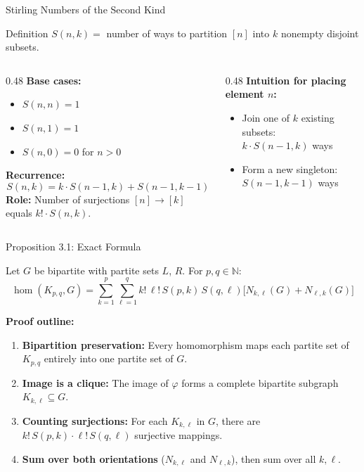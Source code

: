 \documentclass[aspectratio=169]{beamer}
\begin{document}
\begin{frame}{Stirling Numbers of the Second Kind}
  \begin{block}{Definition}
    $S(n,k) = $ number of ways to partition $[n]$ into $k$ nonempty disjoint subsets.
  \end{block}

  \begin{columns}
    \begin{column}{0.48\textwidth}
      \textbf{Base cases:}
      \begin{itemize}
        \item $S(n,n) = 1$
        \item $S(n,1) = 1$
        \item $S(n,0) = 0$ for $n > 0$
      \end{itemize}
      \textbf{Recurrence:}
      \[
        S(n,k) = k \cdot S(n-1,k) + S(n-1,k-1)
      \]
      \textbf{Role:} Number of surjections $[n] \to [k]$ equals $k! \cdot S(n,k)$.
    \end{column}
    \begin{column}{0.48\textwidth}
      \textbf{Intuition for placing element $n$:}
      \begin{itemize}
        \item Join one of $k$ existing subsets:\\
          $k \cdot S(n-1,k)$ ways
        \item Form a new singleton:\\
          $S(n-1,k-1)$ ways
      \end{itemize}
    \end{column}
  \end{columns}
\end{frame}

\begin{frame}{Proposition 3.1: Exact Formula}
  \begin{theorem}[Proposition 3.1]
    Let $G$ be bipartite with partite sets $L$, $R$. For $p, q \in \mathbb{N}$:
    \[
      \hom(K_{p,q}, G) = \sum_{k=1}^{p} \sum_{\ell=1}^{q} k!\, \ell!\, S(p,k)\, S(q,\ell)
      \bigl[N_{k,\ell}(G) + N_{\ell,k}(G)\bigr]
    \]
  \end{theorem}

  \textbf{Proof outline:}
  \begin{enumerate}
    \item \textbf{Bipartition preservation:} Every homomorphism maps each partite set of $K_{p,q}$ entirely into one partite set of $G$.
    \item \textbf{Image is a clique:} The image of $\varphi$ forms a complete bipartite subgraph $K_{k,\ell} \subseteq G$.
    \item \textbf{Counting surjections:} For each $K_{k,\ell}$ in $G$, there are $k!\,S(p,k) \cdot \ell!\,S(q,\ell)$ surjective mappings.
    \item \textbf{Sum over both orientations} ($N_{k,\ell}$ and $N_{\ell,k}$), then sum over all $k, \ell$.
  \end{enumerate}
\end{frame}
\end{document}
